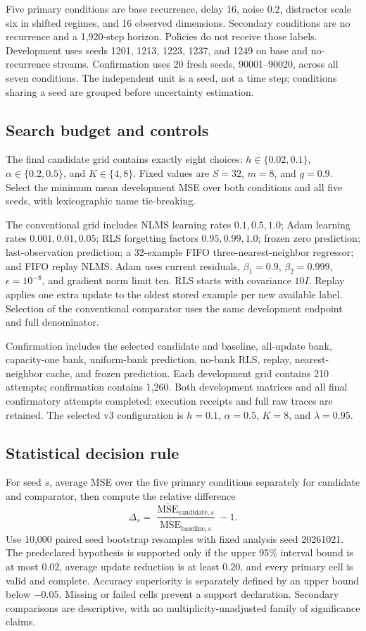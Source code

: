 \documentclass[10pt]{article}
\begin{document}
Five primary conditions are base recurrence, delay 16, noise $0.2$, distractor scale six in shifted regimes, and 16 observed dimensions. Secondary conditions are no recurrence and a 1,920-step horizon. Policies do not receive those labels. Development uses seeds 1201, 1213, 1223, 1237, and 1249 on base and no-recurrence streams. Confirmation uses 20 fresh seeds, 90001--90020, across all seven conditions. The independent unit is a seed, not a time step; conditions sharing a seed are grouped before uncertainty estimation.

\subsection{Search budget and controls}
The final candidate grid contains exactly eight choices: $h\in\{0.02,0.1\}$, $\alpha\in\{0.2,0.5\}$, and $K\in\{4,8\}$. Fixed values are $S=32$, $m=8$, and $g=0.9$. Select the minimum mean development MSE over both conditions and all five seeds, with lexicographic name tie-breaking.

The conventional grid includes NLMS learning rates $0.1,0.5,1.0$; Adam learning rates $0.001,0.01,0.05$; RLS forgetting factors $0.95,0.99,1.0$; frozen zero prediction; last-observation prediction; a 32-example FIFO three-nearest-neighbor regressor; and FIFO replay NLMS. Adam uses current residuals, $\beta_1=0.9$, $\beta_2=0.999$, $\epsilon=10^{-8}$, and gradient norm limit ten. RLS starts with covariance $10I$. Replay applies one extra update to the oldest stored example per new available label. Selection of the conventional comparator uses the same development endpoint and full denominator.

Confirmation includes the selected candidate and baseline, all-update bank, capacity-one bank, uniform-bank prediction, no-bank RLS, replay, nearest-neighbor cache, and frozen prediction. Each development grid contains 210 attempts; confirmation contains 1,260. Both development matrices and all final confirmatory attempts completed; execution receipts and full raw traces are retained. The selected v3 configuration is $h=0.1$, $\alpha=0.5$, $K=8$, and $\lambda=0.95$.

\subsection{Statistical decision rule}
For seed $s$, average MSE over the five primary conditions separately for candidate and comparator, then compute the relative difference
\[
 \Delta_s=\frac{\overline{\operatorname{MSE}}_{\mathrm{candidate},s}}
 {\overline{\operatorname{MSE}}_{\mathrm{baseline},s}}-1.
\]
Use 10,000 paired seed bootstrap resamples with fixed analysis seed 20261021. The predeclared hypothesis is supported only if the upper 95\% interval bound is at most $0.02$, average update reduction is at least $0.20$, and every primary cell is valid and complete. Accuracy superiority is separately defined by an upper bound below $-0.05$. Missing or failed cells prevent a support declaration. Secondary comparisons are descriptive, with no multiplicity-unadjusted family of significance claims.
\end{document}
